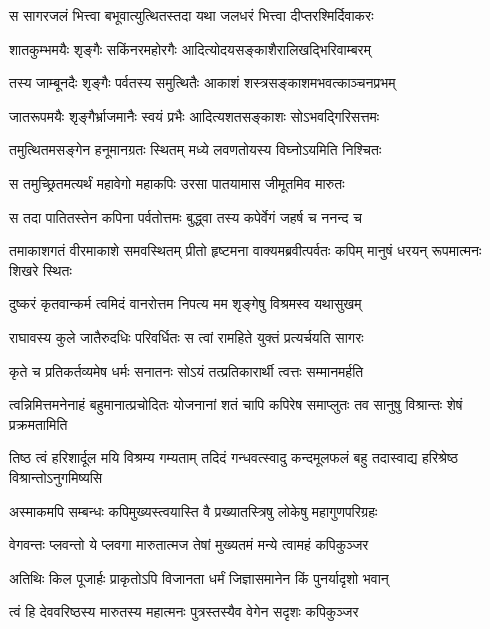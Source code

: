\twolineshloka
{स सागरजलं भित्त्वा बभूवात्युत्थितस्तदा}
{यथा जलधरं भित्त्वा दीप्तरश्मिर्दिवाकरः} %

\twolineshloka
{शातकुम्भमयैः शृङ्गैः सकिंनरमहोरगैः}
{आदित्योदयसङ्काशैरालिखद्भिरिवाम्बरम्} %

\twolineshloka
{तस्य जाम्बूनदैः शृङ्गैः पर्वतस्य समुत्थितैः}
{आकाशं शस्त्रसङ्काशमभवत्काञ्चनप्रभम्} %

\twolineshloka
{जातरूपमयैः शृङ्गैर्भ्राजमानैः स्वयं प्रभैः}
{आदित्यशतसङ्काशः सोऽभवद्गिरिसत्तमः} %

\twolineshloka
{तमुत्थितमसङ्गेन हनूमानग्रतः स्थितम्}
{मध्ये लवणतोयस्य विघ्नोऽयमिति निश्चितः} %

\twolineshloka
{स तमुच्छ्रितमत्यर्थं महावेगो महाकपिः}
{उरसा पातयामास जीमूतमिव मारुतः} %

\twolineshloka
{स तदा पातितस्तेन कपिना पर्वतोत्तमः}
{बुद्ध्वा तस्य कपेर्वेगं जहर्ष च ननन्द च} %

\threelineshloka
{तमाकाशगतं वीरमाकाशे समवस्थितम्}
{प्रीतो हृष्टमना वाक्यमब्रवीत्पर्वतः कपिम्}
{मानुषं धरयन् रूपमात्मनः शिखरे स्थितः} %

\twolineshloka
{दुष्करं कृतवान्कर्म त्वमिदं वानरोत्तम}
{निपत्य मम शृङ्गेषु विश्रमस्व यथासुखम्} %

\twolineshloka
{राघावस्य कुले जातैरुदधिः परिवर्धितः}
{स त्वां रामहिते युक्तं प्रत्यर्चयति सागरः} %

\twolineshloka
{कृते च प्रतिकर्तव्यमेष धर्मः सनातनः}
{सोऽयं तत्प्रतिकारार्थी त्वत्तः सम्मानमर्हति} %

\threelineshloka
{त्वन्निमित्तमनेनाहं बहुमानात्प्रचोदितः}
{योजनानां शतं चापि कपिरेष समाप्लुतः}
{तव सानुषु विश्रान्तः शेषं प्रक्रमतामिति} %

\threelineshloka
{तिष्ठ त्वं हरिशार्दूल मयि विश्रम्य गम्यताम्}
{तदिदं गन्धवत्स्वादु कन्दमूलफलं बहु}
{तदास्वाद्य हरिश्रेष्ठ विश्रान्तोऽनुगमिष्यसि} %

\twolineshloka
{अस्माकमपि सम्बन्धः कपिमुख्यस्त्वयास्ति वै}
{प्रख्यातस्त्रिषु लोकेषु महागुणपरिग्रहः} %

\twolineshloka
{वेगवन्तः प्लवन्तो ये प्लवगा मारुतात्मज}
{तेषां मुख्यतमं मन्ये त्वामहं कपिकुञ्जर} %

\twolineshloka
{अतिथिः किल पूजार्हः प्राकृतोऽपि विजानता}
{धर्मं जिज्ञासमानेन किं पुनर्यादृशो भवान्} %

\twolineshloka
{त्वं हि देववरिष्ठस्य मारुतस्य महात्मनः}
{पुत्रस्तस्यैव वेगेन सदृशः कपिकुञ्जर} %


